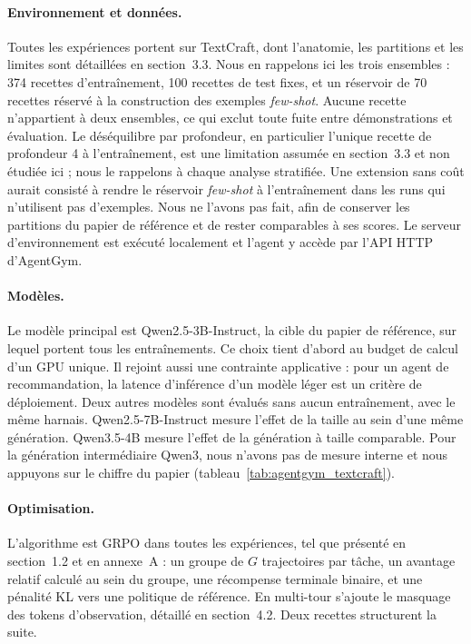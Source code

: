 \documentclass[11pt,a4paper]{article}
\begin{document}
\paragraph{Environnement et données.} Toutes les expériences portent sur TextCraft, dont l'anatomie, les partitions et les limites sont détaillées en section~3.3. Nous en rappelons ici les trois ensembles : 374 recettes d'entraînement, 100 recettes de test fixes, et un réservoir de 70 recettes réservé à la construction des exemples \emph{few-shot}. Aucune recette n'appartient à deux ensembles, ce qui exclut toute fuite entre démonstrations et évaluation. Le déséquilibre par profondeur, en particulier l'unique recette de profondeur 4 à l'entraînement, est une limitation assumée en section~3.3 et non étudiée ici ; nous le rappelons à chaque analyse stratifiée. Une extension sans coût aurait consisté à rendre le réservoir \emph{few-shot} à l'entraînement dans les runs qui n'utilisent pas d'exemples. Nous ne l'avons pas fait, afin de conserver les partitions du papier de référence et de rester comparables à ses scores. Le serveur d'environnement est exécuté localement et l'agent y accède par l'API HTTP d'AgentGym.

\paragraph{Modèles.} Le modèle principal est Qwen2.5-3B-Instruct, la cible du papier de référence, sur lequel portent tous les entraînements. Ce choix tient d'abord au budget de calcul d'un GPU unique. Il rejoint aussi une contrainte applicative : pour un agent de recommandation, la latence d'inférence d'un modèle léger est un critère de déploiement. Deux autres modèles sont évalués sans aucun entraînement, avec le même harnais. Qwen2.5-7B-Instruct mesure l'effet de la taille au sein d'une même génération. Qwen3.5-4B mesure l'effet de la génération à taille comparable. Pour la génération intermédiaire Qwen3, nous n'avons pas de mesure interne et nous appuyons sur le chiffre du papier (tableau~\ref{tab:agentgym_textcraft}). 



\paragraph{Optimisation.} L'algorithme est GRPO dans toutes les expériences, tel que présenté en section~1.2 et en annexe~A : un groupe de $G$ trajectoires par tâche, un avantage relatif calculé au sein du groupe, une récompense terminale binaire, et une pénalité KL vers une politique de référence. En multi-tour s'ajoute le masquage des tokens d'observation, détaillé en section~4.2. Deux recettes structurent la suite.
\end{document}
